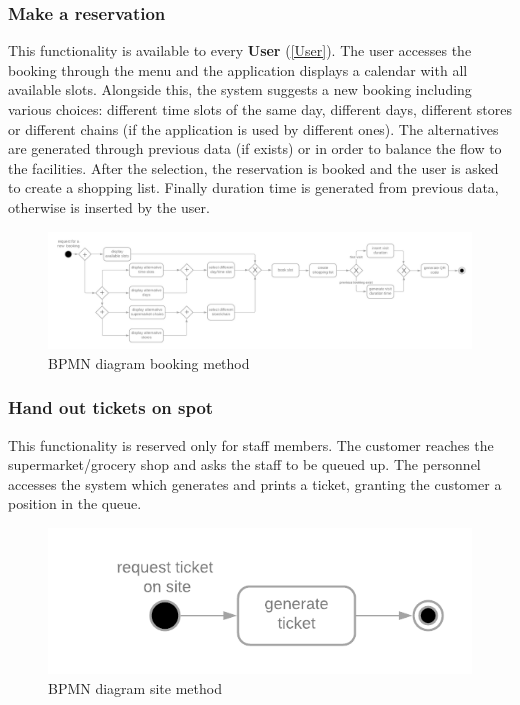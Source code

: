 \documentclass[table, 12pt]{article}
\begin{document}
\subsubsection{Make a reservation}
\label{book_a_visit}
This functionality is available to every \textbf{User} (\ref{User}). The user accesses the booking through the menu and the application displays a calendar with all available slots. Alongside this, the system suggests a new booking including various choices: different time slots of the same day, different days, different stores or different chains (if the application is used by different ones). The alternatives are generated through previous data (if exists) or in order to balance the flow to the facilities. After the selection, the reservation is booked and the user is asked to create a shopping list. Finally duration time is generated from previous data, otherwise is inserted by the user.
\begin{figure}[H]
    \begin{center}
        \includegraphics[scale=0.15]{assets/Functions/function-book-a-visit.png}
        \caption{BPMN diagram booking method}
    \end{center}
\end{figure}
\subsubsection{Hand out tickets on spot}

This functionality is reserved only for staff members. The customer reaches the supermarket/grocery shop and asks the staff to be queued up. The personnel accesses the system which generates and prints a ticket, granting the customer a position in the queue.
\begin{figure}[H]
    \begin{center}
        \includegraphics[scale=0.5]{assets/Functions/function-hand-up.png}
        \caption{BPMN diagram site method}
    \end{center}
\end{figure}
\end{document}
